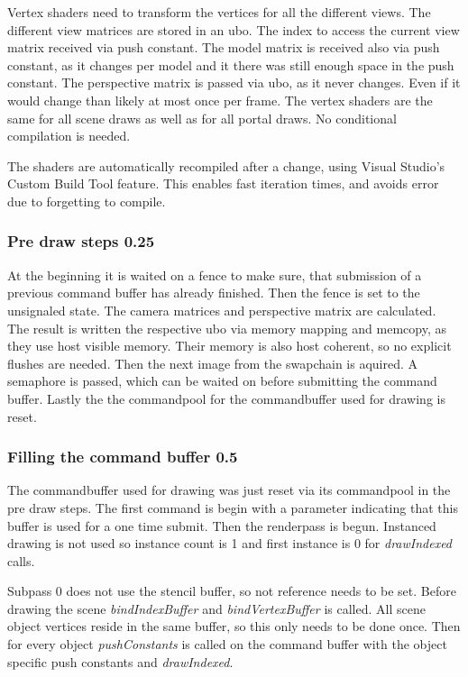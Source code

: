 Vertex shaders need to transform the vertices for all the different views. The different view matrices are stored in an \gls{ubo}. The index to access the current view matrix received via push constant. The model matrix is received also via push constant, as it changes per model and it there was still enough space in the push constant. The perspective matrix is passed via \gls{ubo}, as it never changes. Even if it would change than likely at most once per frame. The vertex shaders are the same for all scene draws as well as for all portal draws. No conditional compilation is needed.


The shaders are automatically recompiled after a change, using Visual Studio's Custom Build Tool feature. This enables fast iteration times, and avoids error due to forgetting to compile.

\subsubsection{Pre draw steps 0.25}

At the beginning it is waited on a fence to make sure, that submission of a previous command buffer has already finished. Then the fence is set to the unsignaled state. The camera matrices and perspective matrix are calculated. The result is written the respective \gls{ubo} via memory mapping and memcopy, as they use host visible memory. Their memory is also host coherent, so no explicit flushes are needed.
Then the next image from the swapchain is aquired. A semaphore is passed, which can be waited on before submitting the command buffer.
Lastly the the commandpool for the commandbuffer used for drawing is reset.

\subsubsection{Filling the command buffer 0.5}
The commandbuffer used for drawing was just reset via its commandpool in the pre draw steps. The first command is begin with a parameter indicating that this buffer is used for a one time submit. Then the renderpass is begun. Instanced drawing is not used so instance count is 1 and first instance is 0 for \textit{drawIndexed} calls.

Subpass 0 does not use the stencil buffer, so not reference needs to be set. Before drawing the scene \textit{bindIndexBuffer} and \textit{bindVertexBuffer} is called. All scene object vertices reside in the same buffer, so this only needs to be done once. Then for every object \textit{pushConstants} is called on the command buffer with the object specific push constants and \textit{drawIndexed}. 

